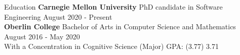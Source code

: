 \documentclass{resume}
\begin{document}
\begin{rSection}{Education}
{\bf Carnegie Mellon University}{ PhD candidate in Software Engineering} \hfill { August 2020 - Present} \\ 
{\bf Oberlin College}{ Bachelor of Arts in Computer Science and Mathematics} \hfill { August 2016 - May 2020} \\
With a Concentration in Cognitive Science \hfill {(Major) GPA: (3.77) 3.71} 
\end{rSection}

\end{document}
